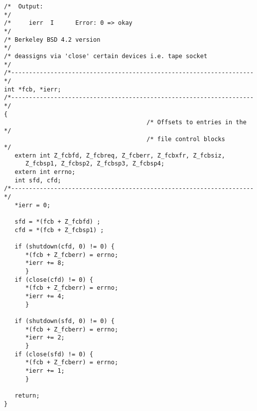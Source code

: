\begin{center}
\begin{verbatim}
/*  Output:                                                           */
/*     ierr  I      Error: 0 => okay                                  */
/* Berkeley BSD 4.2 version                                           */
/* deassigns via 'close' certain devices i.e. tape socket             */
/*--------------------------------------------------------------------*/
int *fcb, *ierr;
/*--------------------------------------------------------------------*/
{
                                        /* Offsets to entries in the  */
                                        /* file control blocks        */
   extern int Z_fcbfd, Z_fcbreq, Z_fcberr, Z_fcbxfr, Z_fcbsiz,
      Z_fcbsp1, Z_fcbsp2, Z_fcbsp3, Z_fcbsp4;
   extern int errno;
   int sfd, cfd;
/*--------------------------------------------------------------------*/
   *ierr = 0;

   sfd = *(fcb + Z_fcbfd) ;
   cfd = *(fcb + Z_fcbsp1) ;

   if (shutdown(cfd, 0) != 0) {
      *(fcb + Z_fcberr) = errno;
      *ierr += 8;
      }
   if (close(cfd) != 0) {
      *(fcb + Z_fcberr) = errno;
      *ierr += 4;
      }

   if (shutdown(sfd, 0) != 0) {
      *(fcb + Z_fcberr) = errno;
      *ierr += 2;
      }
   if (close(sfd) != 0) {
      *(fcb + Z_fcberr) = errno;
      *ierr += 1;
      }

   return;
}

\end{verbatim}
\end{center}


